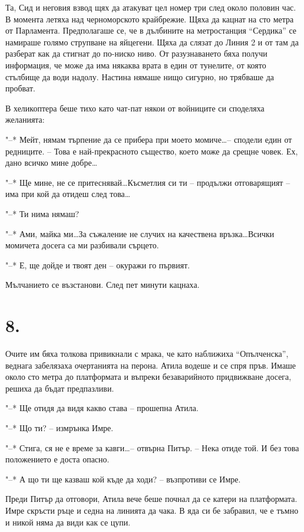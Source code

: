 \documentclass[ebook,openany,12pt]{memoir}
\begin{document}
Та, Сид и неговия взвод щях да атакуват цел номер три след около половин час. В момента летяха над черноморското крайбрежие. Щяха да кацнат на сто метра от Парламента. Предполагаше се, че в дълбините на метростанция ``Сердика'' се намираше голямо струпване на яйцегени. Щяха да слязат до Линия 2 и от там да разберат как да стигнат до по-ниско ниво. От разузнаването бяха получи информация, че може да има някаква врата в един от тунелите, от която стълбище да води надолу. Настина нямаше нищо сигурно, но трябваше да пробват.

В хеликоптера беше тихо като чат-пат някои от войниците си споделяха желанията:

"--* Мейт, нямам търпение да се прибера при моето момиче\ldots -- сподели един от редниците. – Това е най-прекрасното същество, което може да срещне човек. Ех, дано всичко мине добре\ldots

"--* Ще мине, не се притеснявай\ldots Късметлия си ти – продължи отговарящият – има при кой да отидеш след това\ldots

"--* Ти нима нямаш?

"--* Ами, майка ми\ldots За съжаление не случих на качествена връзка\ldots Всички момичета досега са ми разбивали сърцето.

"--* Е, ще дойде и твоят ден – окуражи го първият.

Мълчанието се възстанови. След пет минути кацнаха.

\section*{8.}

Очите им бяха толкова привикнали с мрака, че като наближиха ``Опълченска'', веднага забелязаха очертанията на перона. Атила водеше и се спря пръв. Имаше около сто метра до платформата и въпреки безаварийното придвижване досега, решиха да бъдат предпазливи.

"--* Ще отидя да видя какво става – прошепна Атила.

"--* Що ти? – измрънка Имре.

"--* Стига, ся не е време за кавги\ldots -- отвърна Питър. – Нека отиде той. И без това положението е доста опасно.

"--* А що ти ще казваш кой къде да ходи? – възпротиви се Имре.

Преди Питър да отговори, Атила вече беше почнал да се катери на платформата. Имре скръсти ръце и седна на линията да чака. В яда си бе забравил, че е тъмно и никой няма да види как се цупи.
\end{document}
